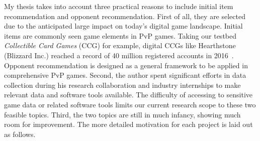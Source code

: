 My thesis takes into account three practical reasons to include initial item recommendation and opponent recommendation. First of all, they are selected due to the anticipated large impact on today's digital game landscape. Initial items are commonly seen game elements in PvP games. Taking our testbed \textit{Collectible Card Games} (CCG) for example, digital CCGs like Hearthstone (Blizzard Inc.) reached a record of 40 million registered accounts in 2016~\cite{hearthstonepopular}. Opponent recommendation is designed as a general framework to be applied in comprehensive PvP games. Second, the author spent significant efforts in data collection during his research collaboration and industry internships to make relevant data and software tools available. The difficulty of accessing to sensitive game data or related software tools limits our current research scope to these two feasible topics. Third, the two topics are still in much infancy, showing much room for improvement. The more detailed motivation for each project is laid out as follows. 


